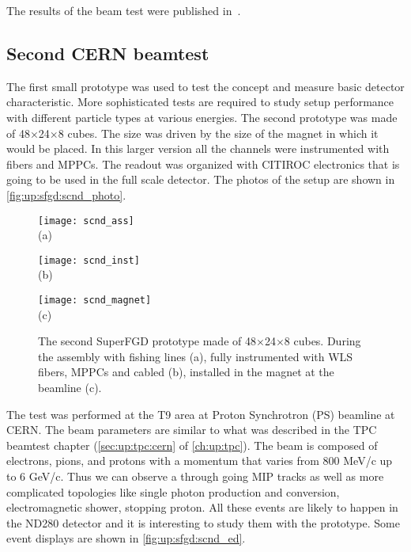 \documentclass[main.tex]{subfiles}
\begin{document}
The results of the beam test were published in~\cite{Mineev2019}.

\subsection{Second CERN beamtest}
\label{sec:up:sfgd:beam2}
The first small prototype was used to test the concept and measure basic detector characteristic. More sophisticated tests are required to study setup performance with different particle types at various energies. The second prototype was made of 48$\times$24$\times$8 cubes. The size was driven by the size of the magnet in which it would be placed. In this larger version all the channels were instrumented with fibers and MPPCs. The readout was organized with CITIROC electronics that is going to be used in the full scale detector. The photos of the setup are shown in \autoref{fig:up:sfgd:scnd_photo}.

\begin{figure}[!ht]
	\centering
	\begin{minipage}{0.26\linewidth}
		\centering
		\texttt{[image: scnd\_ass]} \\ (a)
	\end{minipage}
	\begin{minipage}{0.36\linewidth}
		\centering
		\texttt{[image: scnd\_inst]} \\ (b)
	\end{minipage}
	\begin{minipage}{0.36\linewidth}
		\centering
		\texttt{[image: scnd\_magnet]} \\ (c)
	\end{minipage}
	\caption{The second SuperFGD prototype made of 48$\times$24$\times$8 cubes. During the assembly with fishing lines (a), fully instrumented with WLS fibers, MPPCs and cabled (b), installed in the magnet at the beamline (c).}
	\label{fig:up:sfgd:scnd_photo}
\end{figure}

The test was performed at the T9 area at Proton Synchrotron (PS) beamline at CERN. The beam parameters are similar to what was described in the TPC beamtest chapter (\autoref{sec:up:tpc:cern} of \autoref{ch:up:tpc}). The beam is composed of electrons, pions, and protons with a momentum that varies from 800 MeV/c up to 6 GeV/c. Thus we can observe a through going MIP tracks as well as more complicated topologies like single photon production and conversion, electromagnetic shower, stopping proton. All these events are likely to happen in the ND280 detector and it is interesting to study them with the prototype. Some event displays are shown in \autoref{fig:up:sfgd:scnd_ed}.
\end{document}

